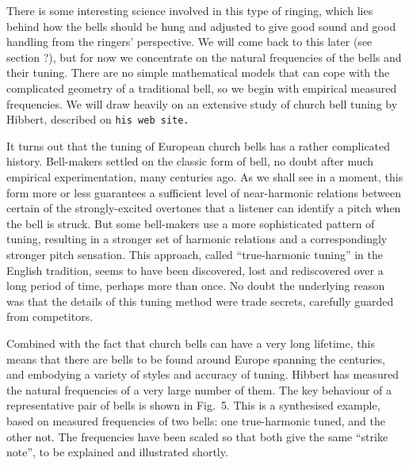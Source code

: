 
\audio{}

  There is some interesting science involved in this type of ringing, which 
  lies behind how the bells should be hung and adjusted to give good sound and 
  good handling from the ringers' perspective. We will come back to this later 
  (see section ?), but for now we concentrate on the natural frequencies of the 
  bells and their tuning. There are no simple mathematical models that can cope 
  with the complicated geometry of a traditional bell, so we begin with 
  empirical measured frequencies. We will draw heavily on an extensive study of 
  church bell tuning by Hibbert, described on \tt{}his web site\rm{}. 

  It turns out that the tuning of European church bells has a rather 
  complicated history. Bell-makers settled on the classic form of bell, no 
  doubt after much empirical experimentation, many centuries ago. As we shall 
  see in a moment, this form more or less guarantees a sufficient level of 
  near-harmonic relations between certain of the strongly-excited overtones 
  that a listener can identify a pitch when the bell is struck. But some 
  bell-makers use a more sophisticated pattern of tuning, resulting in a 
  stronger set of harmonic relations and a correspondingly stronger pitch 
  sensation. This approach, called ``true-harmonic tuning'' in the English 
  tradition, seems to have been discovered, lost and rediscovered over a long 
  period of time, perhaps more than once. No doubt the underlying reason was 
  that the details of this tuning method were trade secrets, carefully guarded 
  from competitors. 

  Combined with the fact that church bells can have a very long lifetime, this 
  means that there are bells to be found around Europe spanning the centuries, 
  and embodying a variety of styles and accuracy of tuning. Hibbert has 
  measured the natural frequencies of a very large number of them. The key 
  behaviour of a representative pair of bells is shown in Fig.\ 5. This is a 
  synthesised example, based on measured frequencies of two bells: one 
  true-harmonic tuned, and the other not. The frequencies have been scaled so 
  that both give the same ``strike note'', to be explained and illustrated 
  shortly. 


